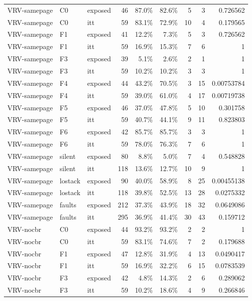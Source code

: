 \begin{tabular}{lllrrrrrr}
VRV-samepage & C0 & exposed & 46 & 87.0\% & 82.6\% & 5 & 3 & 0.726562 \\
VRV-samepage & C0 & itt & 59 & 83.1\% & 72.9\% & 10 & 4 & 0.179565 \\
VRV-samepage & F1 & exposed & 41 & 12.2\% & 7.3\% & 5 & 3 & 0.726562 \\
VRV-samepage & F1 & itt & 59 & 16.9\% & 15.3\% & 7 & 6 & 1 \\
VRV-samepage & F3 & exposed & 39 & 5.1\% & 2.6\% & 2 & 1 & 1 \\
VRV-samepage & F3 & itt & 59 & 10.2\% & 10.2\% & 3 & 3 & 1 \\
VRV-samepage & F4 & exposed & 44 & 43.2\% & 70.5\% & 3 & 15 & 0.00753784 \\
VRV-samepage & F4 & itt & 59 & 39.0\% & 61.0\% & 4 & 17 & 0.00719738 \\
VRV-samepage & F5 & exposed & 46 & 37.0\% & 47.8\% & 5 & 10 & 0.301758 \\
VRV-samepage & F5 & itt & 59 & 40.7\% & 44.1\% & 9 & 11 & 0.823803 \\
VRV-samepage & F6 & exposed & 42 & 85.7\% & 85.7\% & 3 & 3 & 1 \\
VRV-samepage & F6 & itt & 59 & 78.0\% & 76.3\% & 7 & 6 & 1 \\
VRV-samepage & silent & exposed & 80 & 8.8\% & 5.0\% & 7 & 4 & 0.548828 \\
VRV-samepage & silent & itt & 118 & 13.6\% & 12.7\% & 10 & 9 & 1 \\
VRV-samepage & lostack & exposed & 90 & 40.0\% & 58.9\% & 8 & 25 & 0.00455138 \\
VRV-samepage & lostack & itt & 118 & 39.8\% & 52.5\% & 13 & 28 & 0.0275332 \\
VRV-samepage & faults & exposed & 212 & 37.3\% & 43.9\% & 18 & 32 & 0.0649086 \\
VRV-samepage & faults & itt & 295 & 36.9\% & 41.4\% & 30 & 43 & 0.159712 \\
VRV-nocbr & C0 & exposed & 44 & 93.2\% & 93.2\% & 2 & 2 & 1 \\
VRV-nocbr & C0 & itt & 59 & 83.1\% & 74.6\% & 7 & 2 & 0.179688 \\
VRV-nocbr & F1 & exposed & 47 & 12.8\% & 31.9\% & 4 & 13 & 0.0490417 \\
VRV-nocbr & F1 & itt & 59 & 16.9\% & 32.2\% & 6 & 15 & 0.0783539 \\
VRV-nocbr & F3 & exposed & 42 & 4.8\% & 14.3\% & 2 & 6 & 0.289062 \\
VRV-nocbr & F3 & itt & 59 & 10.2\% & 18.6\% & 4 & 9 & 0.266846 \\

\end{tabular}
